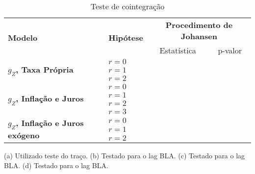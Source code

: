 \begin{table}[htb]
\centering
\caption{Teste de cointegração}
\label{Johansen}
\begin{threeparttable}
\begin{tabular}{l|l|cc}
\hline
 \hline
\multirow{2}{*}{\textbf{Modelo}} & \multirow{2}{*}{\textbf{Hipótese}\tnote{a}} & \multicolumn{2}{c}{\textbf{Procedimento de Johansen}} \\ \cline{3-4} 
 &  & \multicolumn{1}{c|}{Estatística} & p-valor \\ \hline
\multirow{3}{*}{\textbf{$g_Z$, Taxa Própria}\tnote{b}} & $r = 0$ &  &  \\
 & $r = 1$ &  &  \\
 & $r = 2$ &  &  \\ \hline
\multirow{4}{*}{\textbf{$g_Z$, Inflação e Juros}\tnote{c}} & $r = 0$ &  & \\
 & $r = 1$ &  & \\
 & $r = 2$ &  & \\
  & $r = 3$ &  & \\ \hline 
\multirow{3}{*}{\textbf{$g_Z$, Inflação e Juros exógeno}\tnote{d}} & $r = 0$ &  & \\ 
 & $r = 1$ &  & \\ 
  & $r = 2$ &  & \\ \hline
  \hline
\end{tabular}%
\footnotesize{(a) Utilizado teste do traço. (b) Testado para o lag BLA. (c) Testado para o lag BLA. (d) Testado para o lag BLA.}
\end{threeparttable}
\end{table}